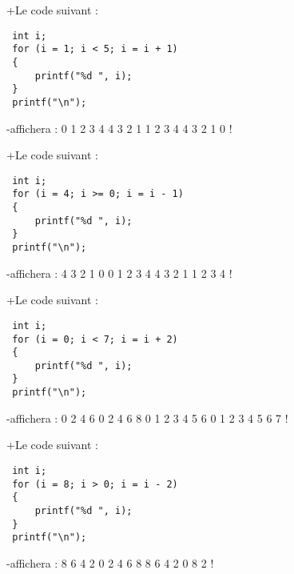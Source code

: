 +Le code suivant :
 \begin{verbatim}
 int i;
 for (i = 1; i < 5; i = i + 1)
 {
     printf("%d ", i); 
 }
 printf("\n");
\end{verbatim}
-affichera :
 0 1 2 3 4
 4 3 2 1
 1 2 3 4
 4 3 2 1 0
!

+Le code suivant :
 \begin{verbatim}
 int i;
 for (i = 4; i >= 0; i = i - 1)
 {
     printf("%d ", i); 
 }
 printf("\n");
\end{verbatim}
-affichera :
 4 3 2 1 0
 0 1 2 3 4
 4 3 2 1
 1 2 3 4
!

+Le code suivant :
 \begin{verbatim}
 int i;
 for (i = 0; i < 7; i = i + 2)
 {
     printf("%d ", i); 
 }
 printf("\n");
\end{verbatim}
-affichera :
 0 2 4 6
 0 2 4 6 8
 0 1 2 3 4 5 6
 0 1 2 3 4 5 6 7
!

+Le code suivant :
 \begin{verbatim}
 int i;
 for (i = 8; i > 0; i = i - 2)
 {
     printf("%d ", i); 
 }
 printf("\n");
\end{verbatim}
-affichera :
 8 6 4 2
 0 2 4 6 8
 8 6 4 2 0
 8 2
!